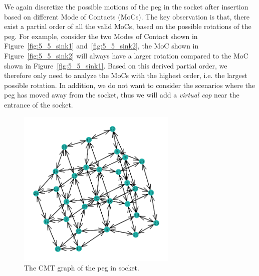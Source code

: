 \documentclass[11pt, twocolumn]{article}
\begin{document}
We again discretize the possible motions of the peg in the socket after insertion based on different Mode of Contacts (MoCs). The key observation is that, there exist a partial order of all the valid MoCs, based on the possible rotations of the peg. For example, consider the two Modes of Contact shown in Figure~\ref{fig:5_5_sink1} and~\ref{fig:5_5_sink2}, the MoC shown in Figure~\ref{fig:5_5_sink2} will always have a larger rotation compared to the MoC shown in Figure~\ref{fig:5_5_sink1}. Based on this derived partial order, we therefore only need to analyze the MoCs with the highest order, i.e. the largest possible rotation. In addition, we do not want to consider the scenarios where the peg has moved away from the socket, thus we will add a {\em virtual cap} near the entrance of the socket. 

\begin{figure}[t]
\begin{center}
\includegraphics[width=3in]{figures/rocking_graph.png}
\end{center}
\caption{The CMT graph of the peg in socket. }
\label{fig:rocking_graph}
\end{figure}

\end{document}
